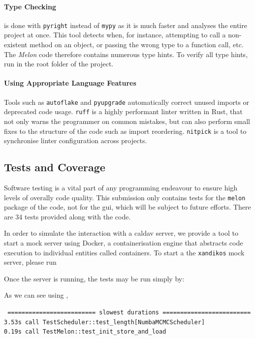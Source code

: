 \documentclass{prettytex/ox/mmsc-special-topic}
\begin{document}
  \paragraph{Type Checking} is done with \texttt{pyright} instead of \texttt{mypy} as it is much faster and analyses the entire project at once. This tool detects when, for instance, attempting to call a non-existent method on an object, or passing the wrong type to a function call, etc.
  The \textit{Melon} code therefore contains numerous type hints.
  To verify all type hints, run  in the root folder of the project.

  \paragraph{Using Appropriate Language Features}
  Tools such as \texttt{autoflake} and \texttt{pyupgrade} automatically correct unused imports or deprecated code usage.
  \texttt{ruff} is a highly performant linter written in Rust, that not only warns the programmer on common mistakes, but can also perform small fixes to the structure of the code such as import reordering.
  \texttt{nitpick} is a tool to synchronise linter configuration across projects.

  \subsection{Tests and Coverage}
  Software testing is a vital part of any programming endeavour to ensure high levels of overally code quality.
  This submission only contains tests for the \texttt{melon} package of the code, not for the \gls{gui}, which will be subject to future efforts.
  There are 34 tests provided along with the code.

  In order to simulate the interaction with a \gls{caldav} server, we provide a tool to start a mock server using Docker, a containerisation engine that abstracts code execution to individual entities called containers.
  To start a the \texttt{xandikos} mock server, please run


  Once the server is running, the tests may be run simply by:


  As we can see using ,

  \texttt{
    ========================= slowest durations ========================= \\
    3.53s call TestScheduler::test\_length[NumbaMCMCScheduler] \\
    0.19s call TestMelon::test\_init\_store\_and\_load
  }
\end{document}

